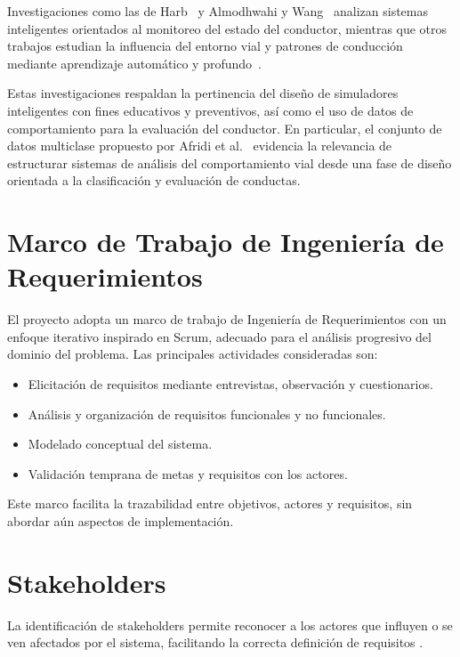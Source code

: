 \documentclass[12pt]{article}
\begin{document}
Investigaciones como las de Harb~\cite{Harb2025} y Almodhwahi y Wang~\cite{Almodhwahi2025} analizan sistemas inteligentes orientados al monitoreo del estado del conductor, mientras que otros trabajos estudian la influencia del entorno vial y patrones de conducción mediante aprendizaje automático y profundo~\cite{Kaselouris202649,Nicolosi2025,Althabhawee2025317}.

Estas investigaciones respaldan la pertinencia del diseño de simuladores inteligentes con fines educativos y preventivos, así como el uso de datos de comportamiento para la evaluación del conductor. En particular, el conjunto de datos multiclase propuesto por Afridi et al.~\cite{Afridi2025} evidencia la relevancia de estructurar sistemas de análisis del comportamiento vial desde una fase de diseño orientada a la clasificación y evaluación de conductas.

\section{Marco de Trabajo de Ingeniería de Requerimientos}
El proyecto adopta un marco de trabajo de Ingeniería de Requerimientos con un enfoque iterativo inspirado en Scrum, adecuado para el análisis progresivo del dominio del problema.  
Las principales actividades consideradas son:

\begin{itemize}
    \item Elicitación de requisitos mediante entrevistas, observación y cuestionarios.
    \item Análisis y organización de requisitos funcionales y no funcionales.
    \item Modelado conceptual del sistema.
    \item Validación temprana de metas y requisitos con los actores.
\end{itemize}

Este marco facilita la trazabilidad entre objetivos, actores y requisitos, sin abordar aún aspectos de implementación.

\section{Stakeholders}

La identificación de stakeholders permite reconocer a los actores que influyen o se ven
afectados por el sistema, facilitando la correcta definición de requisitos \cite{Wiegers2013}.
\end{document}
